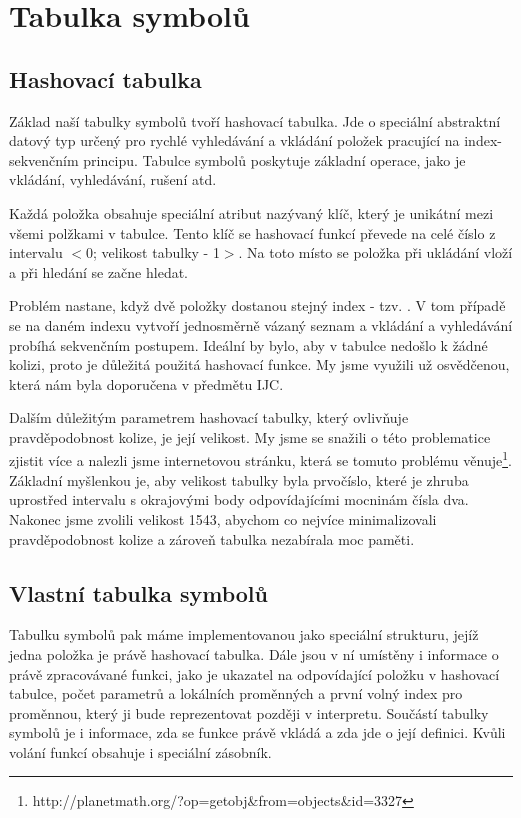 \section{Tabulka symbolů}

\subsection{Hashovací tabulka}

Základ naší tabulky symbolů tvoří hashovací tabulka. Jde o speciální abstraktní datový typ určený pro rychlé vyhledávání a vkládání položek pracující na index-sekvenčním principu. Tabulce symbolů poskytuje základní operace, jako je vkládání, vyhledávání, rušení atd.

Každá položka obsahuje speciální atribut nazývaný klíč, který je unikátní mezi všemi polžkami v tabulce. Tento klíč se hashovací funkcí převede na celé číslo z intervalu $<$0; velikost tabulky - 1$>$. Na toto místo se položka při ukládání vloží a při hledání se začne hledat.

Problém nastane, když dvě položky dostanou stejný index - tzv. . V tom případě se na daném indexu vytvoří jednosměrně vázaný seznam a vkládání a vyhledávání probíhá sekvenčním postupem. Ideální by bylo, aby v tabulce nedošlo k žádné kolizi, proto je důležitá použitá hashovací funkce. My jsme využili už osvědčenou, která nám byla doporučena v předmětu IJC.

Dalším důležitým parametrem hashovací tabulky, který ovlivňuje pravděpodobnost kolize, je její velikost. My jsme se snažili o této problematice zjistit více a nalezli jsme internetovou stránku, která se tomuto problému věnuje\footnote{http://planetmath.org/?op=getobj\&from=objects\&id=3327}. Základní myšlenkou je, aby velikost tabulky byla prvočíslo, které je zhruba uprostřed intervalu s okrajovými body odpovídajícími mocninám čísla dva. Nakonec jsme zvolili velikost 1543, abychom co nejvíce minimalizovali pravděpodobnost kolize a zároveň tabulka nezabírala moc paměti.

\subsection{Vlastní tabulka symbolů}

Tabulku symbolů pak máme implementovanou jako speciální strukturu, jejíž jedna položka je právě hashovací tabulka. Dále jsou v ní umístěny i informace o právě zpracovávané funkci, jako je ukazatel na odpovídající položku v hashovací tabulce, počet parametrů a lokálních proměnných a první volný index pro proměnnou, který ji bude reprezentovat později v interpretu. Součástí tabulky symbolů je i informace, zda se funkce právě vkládá a zda jde o její definici. Kvůli volání funkcí obsahuje i speciální zásobník.

